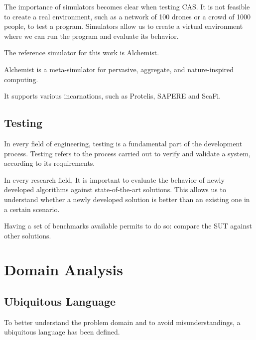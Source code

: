 \documentclass[12pt,a4paper,openright,twoside]{book}
\begin{document}
The importance of simulators becomes clear when testing \ac{CAS}. 
It is not feasible to create a real environment, such as a network of 100 drones or a crowd of 1000 people, to test a program. 
Simulators allow us to create a virtual environment where we can run the program and evaluate its behavior.

The reference simulator for this work is Alchemist. \cite{Pianini_2013}

Alchemist is a meta-simulator for pervasive, aggregate, and nature-inspired computing. 

It supports various incarnations, such as Protelis, SAPERE and ScaFi. \cite{DBLP:conf/sac/PianiniVB15, DBLP:conf/saso/CastelliMRZ11, DBLP:journals/softx/CasadeiVAP22}

\section{Testing}

In every field of engineering, testing is a fundamental part of the development process.
Testing refers to the process carried out to verify and validate a system, according to its requirements. \cite{Spillner2011}

In every research field, It is important to evaluate the behavior of newly developed algorithms against state-of-the-art solutions.
This allows us to understand whether a newly developed solution is better than an existing one in a certain scenario.

Having a set of benchmarks available permits to do so: compare the \ac{SUT} against other solutions.

\chapter{Domain Analysis}

\section{Ubiquitous Language}

To better understand the problem domain and to avoid misunderstandings, a ubiquitous language has been defined.
\end{document}
